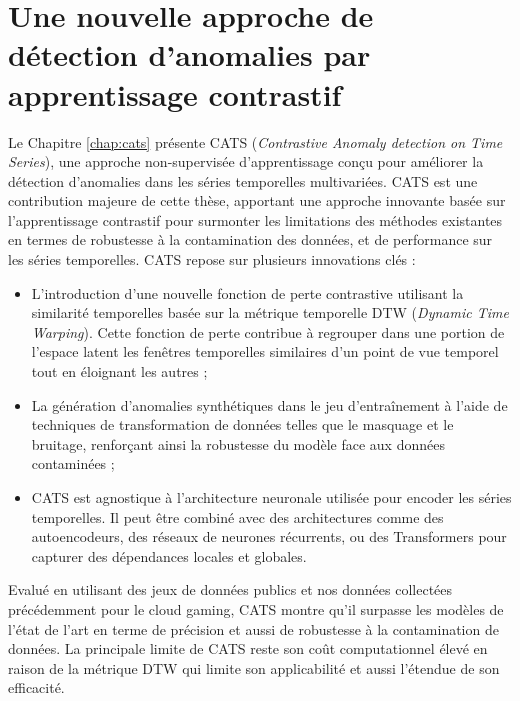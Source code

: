 

\section*{Une nouvelle approche de détection d'anomalies par apprentissage contrastif}

Le Chapitre \ref{chap:cats} présente CATS (\textit{Contrastive Anomaly detection on Time Series}), une approche non-supervisée d'apprentissage conçu pour améliorer la détection d’anomalies dans les séries temporelles multivariées. CATS est une contribution majeure de cette thèse, apportant une approche innovante basée sur l’apprentissage contrastif pour surmonter les limitations des méthodes existantes en termes de robustesse à la contamination des données, et de performance sur les séries temporelles. CATS repose sur plusieurs innovations clés :
\begin{itemize}
    \item L'introduction d'une nouvelle fonction de perte contrastive utilisant la similarité temporelles basée sur la métrique temporelle DTW (\textit{Dynamic Time Warping}). Cette fonction de perte contribue à regrouper dans une portion de l'espace latent les fenêtres temporelles similaires d'un point de vue temporel tout en éloignant les autres ;
    \item La génération d'anomalies synthétiques dans le jeu d'entraînement à l’aide de techniques de transformation de données telles que le masquage et le bruitage, renforçant ainsi la robustesse du modèle face aux données contaminées ;
    \item CATS est agnostique à l’architecture neuronale utilisée pour encoder les séries temporelles. Il peut être combiné avec des architectures comme des autoencodeurs, des réseaux de neurones récurrents, ou des Transformers pour capturer des dépendances locales et globales.
\end{itemize}

Evalué en utilisant des jeux de données publics et nos données collectées précédemment pour le cloud gaming, CATS montre qu'il surpasse les modèles de l'état de l'art en terme de précision et aussi de robustesse à la contamination de données. La principale limite de CATS reste son coût computationnel élevé en raison de la métrique DTW qui limite son applicabilité et aussi l'étendue de son efficacité.

